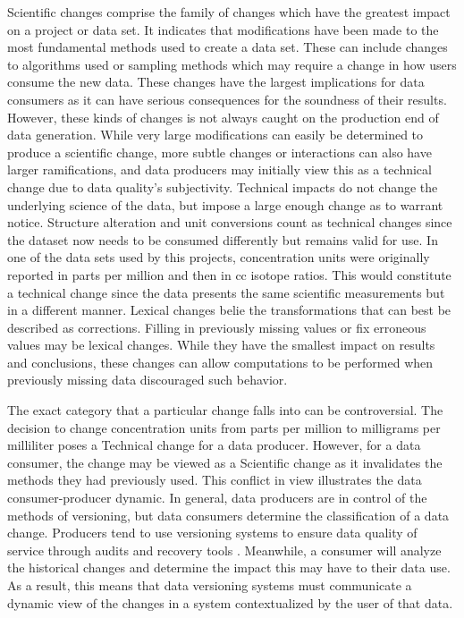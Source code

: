 Scientific changes comprise the family of changes which have the greatest impact on a project or data set.
It indicates that modifications have been made to the most fundamental methods used to create a data set.
These can include changes to algorithms used or sampling methods which may require a change in how users consume the new data.
These changes have the largest implications for data consumers as it can have serious consequences for the soundness of their results.
However, these kinds of changes is not always caught on the production end of data generation.
While very large modifications can easily be determined to produce a scientific change, more subtle changes or interactions can also have larger ramifications, and data producers may initially view this as a technical change due to data quality's subjectivity.
Technical impacts do not change the underlying science of the data, but impose a large enough change as to warrant notice.
Structure alteration and unit conversions count as technical changes since the dataset now needs to be consumed differently but remains valid for use.
In one of the data sets used by this projects, concentration units were originally reported in parts per million and then in cc isotope ratios.
This would constitute a technical change since the data presents the same scientific measurements but in a different manner.
Lexical changes belie the transformations that can best be described as corrections.
Filling in previously missing values or fix erroneous values may be lexical changes.
While they have the smallest impact on results and conclusions, these changes can allow computations to be performed when previously missing data discouraged such behavior.

The exact category that a particular change falls into can be controversial.
The decision to change concentration units from parts per million to milligrams per milliliter poses a Technical change for a data producer.
However, for a data consumer, the change may be viewed as a Scientific change as it invalidates the methods they had previously used.
This conflict in view illustrates the data consumer-producer dynamic.
In general, data producers are in control of the methods of versioning, but data consumers determine the classification of a data change.
Producers tend to use versioning systems to ensure data quality of service through audits and recovery tools \cite{Cavanaugh2002}.
Meanwhile, a consumer will analyze the historical changes and determine the impact this may have to their data use.
As a result, this means that data versioning systems must communicate a dynamic view of the changes in a system contextualized by the user of that data.

